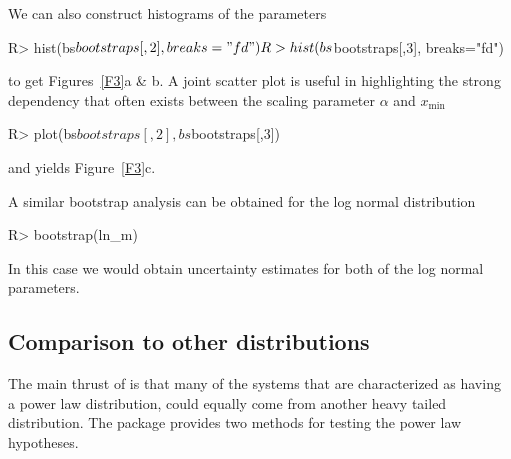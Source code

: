 \documentclass[article]{jss}
\newcommand{\xmin}{x_{\min}}
\begin{document}
We can also construct histograms of the parameters
\begin{Schunk}
\begin{Sinput}
R> hist(bs$bootstraps[,2], breaks="fd")
R> hist(bs$bootstraps[,3], breaks="fd") 
\end{Sinput}
\end{Schunk}

to get Figures~\ref{F3}a \& b. A joint scatter plot is useful in highlighting
the strong dependency that often exists between the scaling parameter $\alpha$
and $\xmin$
\begin{Schunk}
\begin{Sinput}
R> plot(bs$bootstraps[,2], bs$bootstraps[,3])
\end{Sinput}
\end{Schunk}
and yields Figure~\ref{F3}c.

A similar bootstrap analysis can be obtained for the log normal distribution
\begin{Schunk}
\begin{Sinput}
R> bootstrap(ln_m)
\end{Sinput}
\end{Schunk}
In this case we would obtain uncertainty estimates for both of the log normal parameters.

\subsection{Comparison to other distributions}

The main thrust of \cite{Stumpf2012} is that many of the systems that are
characterized as having a power law distribution, could equally come from another
heavy tailed distribution. The  package provides two methods for
testing the power law hypotheses.
\end{document}
